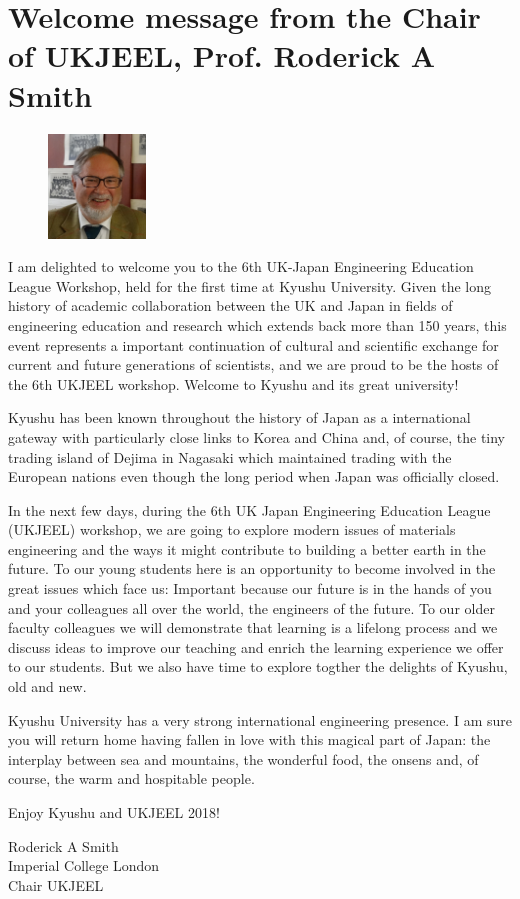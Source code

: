 \newpage
\section[Welcome messages]{Welcome message from the Chair of UKJEEL, Prof. Roderick A Smith}

\begin{figure}
    \begin{center}
        \includegraphics[width=0.23\textwidth]{smith.png}
    \end{center}
\end{figure}

I am delighted to welcome you to the 6th UK-Japan Engineering Education League Workshop, held for the first time at Kyushu University. Given the long history of academic collaboration between the UK and Japan in fields of engineering education and research which extends back more than 150 years, this event represents a important continuation of cultural and scientific exchange for current and future generations of scientists, and we are proud to be the hosts of the 6th UKJEEL workshop.
Welcome to Kyushu and its great university! 

Kyushu has been known throughout the history of Japan as a international gateway with particularly close links to Korea and China and, of course, the tiny trading island of Dejima in Nagasaki which maintained trading with the European nations even though the long period when Japan was officially closed.
 
In the next few days, during the 6th UK Japan Engineering Education League (UKJEEL) workshop, we are going to explore modern issues of materials engineering and the ways it might contribute to building a better earth in the future. To our young students here is an opportunity to become involved in the great issues which face us: Important because our future is in the hands of you and your colleagues all over the world, the engineers of the future. To our older faculty colleagues we will demonstrate that learning is a lifelong process and we discuss ideas to improve our teaching and enrich the learning experience we offer to our students. But we also have time to explore togther the delights of Kyushu, old and new. 

Kyushu University has a very strong international engineering presence. I am sure you will return home having fallen in love with this magical part of Japan: the interplay between sea and mountains, the wonderful food, the onsens and, of course, the warm and hospitable people.

Enjoy Kyushu and UKJEEL 2018!

\vspace{1em}
\noindent Roderick A Smith\\
Imperial College London\\
Chair UKJEEL

